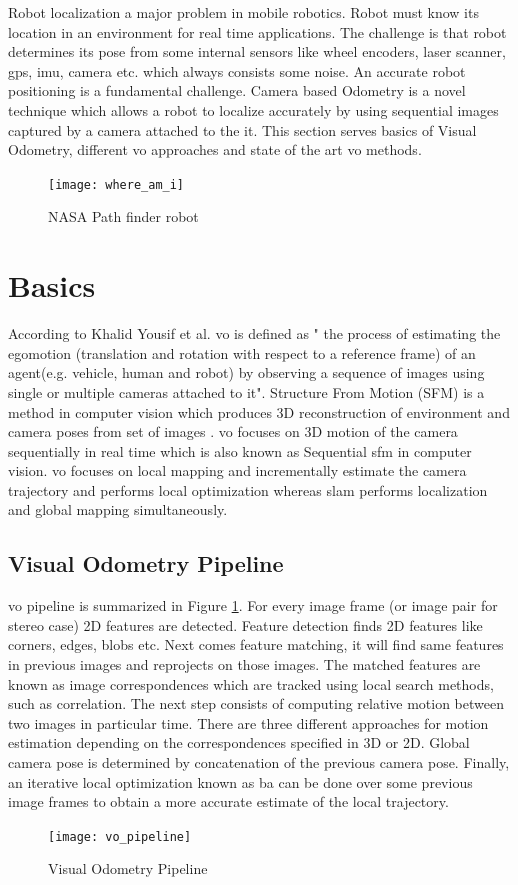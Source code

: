 Robot localization a major problem in mobile robotics. Robot must know its location in an environment for real time applications. The challenge is that robot determines its pose from some internal sensors like wheel encoders, laser scanner, \acrshort{gps}, \acrshort{imu}, camera etc. which always consists some noise. An accurate robot positioning is a fundamental challenge. Camera based Odometry is a novel technique which allows a robot to localize accurately by using sequential images captured by a camera attached to the it. This section serves basics of Visual Odometry, different \acrshort{vo} approaches and state of the art \acrshort{vo} methods.\\
\begin{figure}[h]
	\centering
	\texttt{[image: where\_am\_i]}
	\caption{NASA Path finder robot\cite{nasa}}
\end{figure}
\section{Basics}
According to Khalid Yousif et al.\cite{KhalidYousif-et-al-2015} \acrshort{vo} is defined as " the process of estimating the egomotion (translation and rotation with respect to a reference frame) of an agent(e.g. vehicle, human and robot) by observing a sequence of images using single or multiple cameras attached to it". Structure From Motion (SFM) is a method in computer vision which produces 3D reconstruction of environment and camera poses from set of images \cite{ScaramuzzaVO}. \acrshort{vo} focuses on 3D motion of the camera sequentially in real time which is also known as Sequential \acrshort{sfm} in computer vision. \acrshort{vo} focuses on local mapping and incrementally estimate the camera trajectory and performs local optimization whereas \acrshort{slam} performs localization and global mapping simultaneously.

\subsection{Visual Odometry Pipeline}
\acrshort{vo} pipeline is summarized in Figure \ref{fig:flow}. For every image frame (or image pair for stereo case) 2D features are detected. Feature detection finds 2D features like corners, edges, blobs etc. Next comes feature matching, it will find same features in previous images and reprojects on those images. The matched features are known as image correspondences which are tracked using local search methods, such as correlation. The next step consists of computing relative motion between two images in particular time. There are three different approaches for motion estimation depending on the correspondences specified in 3D or 2D. Global camera pose is determined by concatenation of the previous camera pose. Finally, an iterative local optimization known as \acrshort{ba} can be done over some previous image frames to obtain a more accurate estimate of the local trajectory.
\begin{figure}[h]
	\centering
	\texttt{[image: vo\_pipeline]}
	\caption{Visual Odometry Pipeline}
	\label{fig:flow}
\end{figure}
